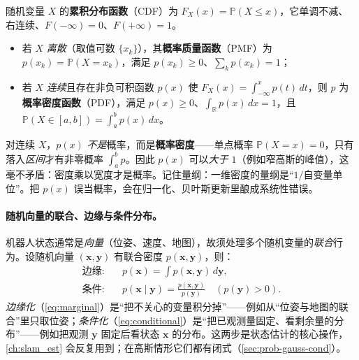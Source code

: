 \begin{definition}\label{def:cdf-pdf}
随机变量 $X$ 的\textbf{累积分布函数}（CDF）为 $F_X(x)=\mathbb{P}(X\le x)$，它单调不减、右连续、$F(-\infty)=0$、$F(+\infty)=1$。
\begin{itemize}
  \item 若 $X$ \emph{离散}（取值可数 $\{x_k\}$），其\textbf{概率质量函数}（PMF）为 $p(x_k)=\mathbb{P}(X=x_k)$，满足 $p(x_k)\ge0$、$\sum_k p(x_k)=1$；
  \item 若 $X$ \emph{连续}且存在非负可积函数 $p(x)$ 使 $F_X(x)=\int_{-\infty}^{x}p(t)\,dt$，则 $p$ 为\textbf{概率密度函数}（PDF），满足 $p(x)\ge0$、$\int_{\mathbb{R}}p(x)\,dx=1$，且 $\mathbb{P}(X\in[a,b])=\int_a^b p(x)\,dx$。
\end{itemize}
\end{definition}

\begin{pitfall}
对连续 $X$，$p(x)$ \emph{不是}概率，而是\textbf{概率密度}——单点概率 $\mathbb{P}(X=x)=0$，只有落入\emph{区间}才有非零概率 $\int_a^b p$。因此 $p(x)$ 可以\emph{大于 $1$}（例如窄高斯的峰值），这毫不矛盾：密度乘以宽度才是概率。记住量纲：一维密度的量纲是“$1/$自变量单位”。把 $p(x)$ 误当概率，会在归一化、贝叶斯更新里酿成系统性错误。
\end{pitfall}

\paragraph{随机向量的联合、边缘与条件分布。}
机器人状态通常是\emph{向量}（位姿、速度、地图），故须处理多个随机变量的\emph{联合}行为。设随机向量 $(\mathbf{x},\mathbf{y})$ 有联合密度 $p(\mathbf{x},\mathbf{y})$，则：
\begin{align}
  \text{边缘}:\quad & p(\mathbf{x})=\int p(\mathbf{x},\mathbf{y})\,d\mathbf{y},\label{eq:marginal}\\
  \text{条件}:\quad & p(\mathbf{x}\mid\mathbf{y})=\frac{p(\mathbf{x},\mathbf{y})}{p(\mathbf{y})}\quad(p(\mathbf{y})>0).\label{eq:conditional}
\end{align}
\emph{边缘化}（\cref{eq:marginal}）是“把不关心的变量积分掉”——例如从“位姿与地图的联合”里只取位姿；\emph{条件化}（\cref{eq:conditional}）是“把已观测量固定、看剩余量的分布”——例如把观测 $\mathbf{y}$ 固定后看状态 $\mathbf{x}$ 的分布。这两步是状态估计的核心操作，\cref{ch:slam_est} 会反复用到；在高斯情形它们都有闭式（\cref{sec:prob-gauss-cond}）。

